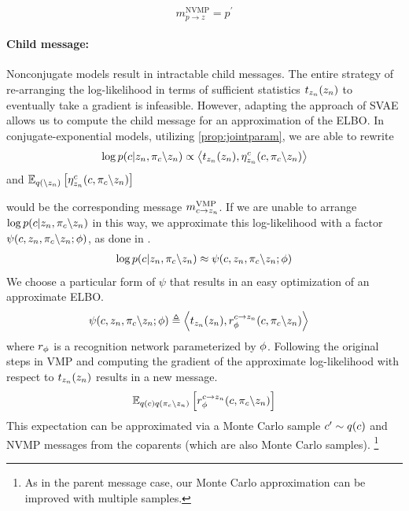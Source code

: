 \begin{equation}
    m^{\text{NVMP}}_{p \rightarrow z} = p^\prime
\end{equation}

\paragraph{Child message:}
Nonconjugate models result in intractable child messages.
The entire strategy of re-arranging
the log-likelihood
in terms of sufficient statistics $t_{z_n}(z_n)$ to eventually
take a gradient is infeasible.
However, adapting the approach of SVAE allows us to
compute the child message for an approximation of the ELBO.
In conjugate-exponential models, utilizing \autoref{prop:jointparam},
we are able to rewrite
\begin{equation}
\log p(c | z_n, \pi_c \backslash z_n) \propto \left\langle t_{z_n}(z_n), \eta_{z_n}^c(c, \pi_c \backslash z_n)\right\rangle 
\end{equation}
and $\mathbb{E}_{q(\backslash z_n)}\left[\eta_{z_n}^c(c, \pi_c \backslash z_n)\right]$

would be the corresponding message $m^{\text{VMP}}_{c \rightarrow z_n}$.
If we are unable to arrange $\log p(c | z_n, \pi_c \backslash z_n)$ in this way, we approximate this log-likelihood with a factor $\psi(c, z_n, \pi_{c} \backslash z_n; \phi)$, as done in \citet{Johnson2016}.
\begin{equation}
\label{eq:rectrick}
\begin{split}
\log p(c | z_n, \pi_c \backslash z_n) &\approx \psi(c, z_n, \pi_{c} \backslash z_n; \phi) \\
\end{split}
\end{equation}
We choose a particular form of $\psi$ that results in an easy optimization
of an approximate ELBO.
\begin{equation}
\begin{split}
    \psi(c, z_n, \pi_{c} \backslash z_n; \phi) &\triangleq \left\langle t_{z_n}(z_n), r^{c \rightarrow z_n}_{\phi}(c, \pi_{c} \backslash z_n)\right\rangle
\end{split}
\end{equation}
where $r_{\phi}$ is a recognition network parameterized by $\phi$.
Following the original steps in VMP
and computing the gradient of the approximate log-likelihood
with respect to $t_{z_n}(z_n)$ results in a new message.
\begin{equation}
    \mathbb{E}_{q(c)q(\pi_c \backslash z_n)} \left[r^{c \rightarrow z_n}_{\phi}(c, \pi_{c}\backslash z_n)\right]
\end{equation}
This expectation can be approximated via a Monte Carlo sample $c' \sim q(c)$
and NVMP messages from the coparents (which are also Monte Carlo samples).
\footnote{As in the parent message case, our Monte Carlo approximation can
be improved with multiple samples.}

